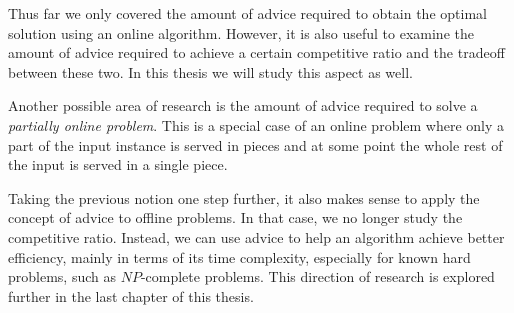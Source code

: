 Thus far we only covered the amount of advice required to obtain the
optimal solution using an online algorithm. However, it is also useful to
examine the amount of advice required to achieve a certain competitive
ratio and the tradeoff between these two. In this thesis we will study
this aspect as well.

Another possible area of research is the amount of advice required to
solve a \emph{partially online problem}. This is a special case of an
online problem where only a part of the input instance is served in pieces
and at some point the whole rest of the input is served in a single piece.

Taking the previous notion one step further, it also makes sense to apply
the concept of advice to offline problems. In that case, we no longer
study the competitive ratio. Instead, we can use advice to help an
algorithm achieve better efficiency, mainly in terms of its time
complexity, especially for known hard problems, such as $NP$-complete
problems. This direction of research is explored further in the last
chapter of this thesis.
